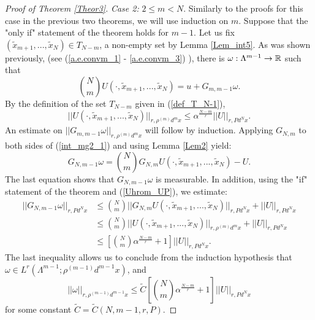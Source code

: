 \documentclass[12pt,leqno]{amsart}
\numberwithin{equation}{section}
\numberwithin{theor}{section}
\numberwithin{rem}{section}
\begin{document}
\begin{proof}[Proof of Theorem \ref{Theor3}]
\textit{Case 2:}  $2\leq m < N$.  Similarly to the proofs for this case in the 
previous two theorems, we will use induction on 
$m$.  Suppose that the "only if" statement of the theorem 
holds for $m-1$.  Let us fix $(\tilde{x}_{m+1},...,\tilde{x}_N)\in 
T_{N-m}$, a non-empty set by Lemma \ref{Lem_int5}.  As was 
shown previously, (see (\ref{a.e.convm_1} - \ref{a.e.convm_3}) ), there is $\omega:\Lambda^{m-1}\rightarrow \Bbb{R}$ such that 
\begin{equation}
\label{int_mg2_1}
\binom{N}{m} U(\cdot,\tilde{x}_{m+1},...,\tilde{x}_{N})=
u + G_{m,m-1} \omega.  
\end{equation}
By the definition of the set $T_{N-m}$ given in (\ref{def_T_N-1}),
\begin{equation}
\label{Uhrom_UP}
|| U(\cdot,\tilde{x}_{m+1},...,\tilde{x}_N)||_{r,\rho^{(m)} d^{m}x } \leq 
\alpha^{\frac{N-m}{r}} || U ||_{r,Pd^{N}x} .  
\end{equation}
An estimate on $|| G_{m,m-1}\omega ||_{r,\rho^{(m)} d^{m}x }$ will follow by induction.  Applying $G_{N,m}$ to both 
sides of (\ref{int_mg2_1}) and using Lemma \ref{Lem2} yield:
\begin{equation}
G_{N,m-1}\omega = \binom{N}{m} 
G_{N,m} U(\cdot,\tilde{x}_{m+1},...,\tilde{x}_{N})-U.
\end{equation}
The last equation shows that $G_{N,m-1}\omega$ is 
measurable.  In addition, using the "if" statement of the 
theorem and (\ref{Uhrom_UP}), we estimate:
\begin{equation}
\label{Gw_est}
\begin{split}
||G_{N,m-1}\omega||_{r,Pd^{N}x}&\leq \binom{N}{m} 
|| G_{N,m} U
(\cdot,\tilde{x}_{m+1},...,\tilde{x}_N)||_{r,Pd^{N}x} + 
|| U ||_{r,Pd^{N}x}\\
&\leq \binom{N}{m} || U
(\cdot,\tilde{x}_{m+1},...,\tilde{x}_N)||_{r,\rho^{(m)}d^{m}x} + 
|| U ||_{r,Pd^{N}x}\\
&\leq \left [ 
\binom{N}{m} \alpha^{\frac{N-m}{r}}
+1 \right ]
|| U ||_{r,Pd^{N}x}.  
\end{split}
\end{equation}
The last inequality allows us to conclude from the induction 
hypothesis that $\omega\in L^{r}(\Lambda^{m-1}; \rho^{(m-1)} d^{m-1}x)$, and
\begin{equation}
\label{w_est}
|| \omega ||_{r,\rho^{(m-1)} d^{m-1} x} \leq \tilde{C} 
\left [ 
\binom{N}{m} \alpha^{\frac{N-m}{r}}
+1 \right ] || U ||_{r,Pd^{N}x}  
\end{equation}
for some constant $\tilde{C}=\tilde{C}(N,m-1,r,P)$.  

\end{proof}
\end{document}
